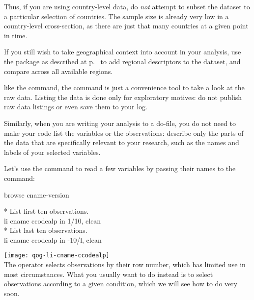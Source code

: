   Thus, if you are using country-level data, do \emph{not} attempt to subset the \qog dataset to a particular selection of countries. The sample size is already very low in a country-level cross-section, as there are just that many countries at a given point in time.%
  
  If you still wish to take geographical context into account in your analysis, use the  package as described at p.~\pageref{qog:geo} to add regional descriptors to the \qog dataset, and compare across all available regions.%

  
   like the  command, the  command is just a convenience tool to take a look at the raw data. Listing the data is done only for exploratory motives: do not publish raw data listings or even save them to your log.%
  
  Similarly, when you are writing your analysis to a do-file, you do not need to make your code list the variables or the observations: describe only the parts of the data that are specifically relevant to your research, such as the names and labels of your selected variables.%

  
  Let's use the  command to read a few variables by passing their names to the  command:%
		\begin{docspec}
			browse cname-version\\
		\end{docspec}


\begin{docspec}
	* List first ten observations.\\
	li cname ccodealp in 1/10, clean\\[1em]
	
	* List last ten observations.\\
	li cname ccodealp in -10/l, clean
\end{docspec}

\texttt{[image: qog-li-cname-ccodealp]}\\[1em]

The  operator selects observations by their row number, which has limited use in most circumstances.%
	What you usually want to do instead is to select observations according to a given condition, which we will see how to do very soon.

